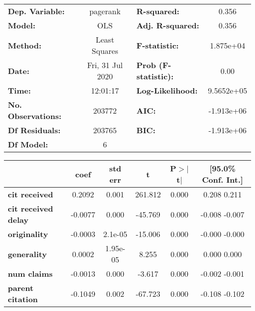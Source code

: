 \begin{center}
\begin{tabular}{lclc}
\toprule
\textbf{Dep. Variable:}     &     pagerank     & \textbf{  R-squared:         } &        0.356     \\
\textbf{Model:}             &       OLS        & \textbf{  Adj. R-squared:    } &        0.356     \\
\textbf{Method:}            &  Least Squares   & \textbf{  F-statistic:       } &    1.875e+04     \\
\textbf{Date:}              & Fri, 31 Jul 2020 & \textbf{  Prob (F-statistic):} &        0.00      \\
\textbf{Time:}              &     12:01:17     & \textbf{  Log-Likelihood:    } &    9.5652e+05    \\
\textbf{No. Observations:}  &      203772      & \textbf{  AIC:               } &    -1.913e+06    \\
\textbf{Df Residuals:}      &      203765      & \textbf{  BIC:               } &    -1.913e+06    \\
\textbf{Df Model:}          &           6      & \textbf{                     } &                  \\
\bottomrule
\end{tabular}
\begin{tabular}{lccccc}
                            & \textbf{coef} & \textbf{std err} & \textbf{t} & \textbf{P$>$$|$t$|$} & \textbf{[95.0\% Conf. Int.]}  \\
\midrule
\textbf{cit received}       &       0.2092  &        0.001     &   261.812  &         0.000        &         0.208     0.211       \\
\textbf{cit received delay} &      -0.0077  &        0.000     &   -45.769  &         0.000        &        -0.008    -0.007       \\
\textbf{originality}        &      -0.0003  &      2.1e-05     &   -15.006  &         0.000        &        -0.000    -0.000       \\
\textbf{generality}         &       0.0002  &     1.95e-05     &     8.255  &         0.000        &         0.000     0.000       \\
\textbf{num claims}         &      -0.0013  &        0.000     &    -3.617  &         0.000        &        -0.002    -0.001       \\
\textbf{parent citation}    &      -0.1049  &        0.002     &   -67.723  &         0.000        &        -0.108    -0.102       \\

\end{tabular}
\end{center}
